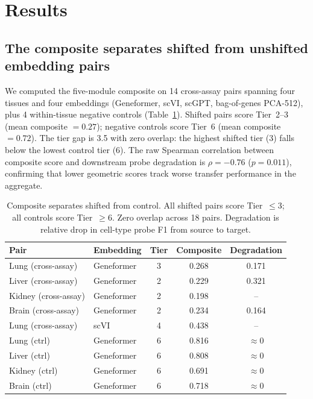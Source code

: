 \documentclass[9pt,lineno]{elife}
\begin{document}
\section{Results}

\subsection{The composite separates shifted from unshifted embedding pairs}

We computed the five-module composite on 14 cross-assay pairs spanning four tissues and four embeddings (Geneformer, scVI, scGPT, bag-of-genes PCA-512), plus 4 within-tissue negative controls (Table~\ref{tab:separation}). Shifted pairs score Tier~2--3 (mean composite $= 0.27$); negative controls score Tier~6 (mean composite $= 0.72$). The tier gap is 3.5 with zero overlap: the highest shifted tier (3) falls below the lowest control tier (6). The raw Spearman correlation between composite score and downstream probe degradation is $\rho = -0.76$ ($p = 0.011$), confirming that lower geometric scores track worse transfer performance in the aggregate.

\begin{table}[t]
\centering
\caption{Composite separates shifted from control. All shifted pairs score Tier~$\leq 3$; all controls score Tier~$\geq 6$. Zero overlap across 18 pairs. Degradation is relative drop in cell-type probe F1 from source to target.}
\label{tab:separation}
\small
\begin{tabular}{@{}llccc@{}}
\toprule
Pair & Embedding & Tier & Composite & Degradation \\
\midrule
Lung (cross-assay) & Geneformer & 3 & 0.268 & 0.171 \\
Liver (cross-assay) & Geneformer & 2 & 0.229 & 0.321 \\
Kidney (cross-assay) & Geneformer & 2 & 0.198 & -- \\
Brain (cross-assay) & Geneformer & 2 & 0.234 & 0.164 \\
Lung (cross-assay) & scVI & 4 & 0.438 & -- \\
\midrule
Lung (ctrl) & Geneformer & 6 & 0.816 & $\approx 0$ \\
Liver (ctrl) & Geneformer & 6 & 0.808 & $\approx 0$ \\
Kidney (ctrl) & Geneformer & 6 & 0.691 & $\approx 0$ \\
Brain (ctrl) & Geneformer & 6 & 0.718 & $\approx 0$ \\
\bottomrule
\end{tabular}
\end{table}
\end{document}

